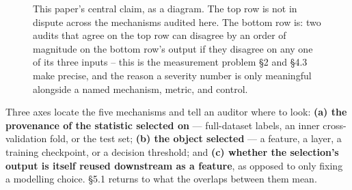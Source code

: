 \documentclass[10pt]{article} %
\begin{document}
\begin{figure}[!ht]
\centering
{}
\caption{This paper's central claim, as a diagram. The top row is not in
dispute across the mechanisms audited here. The bottom row is: two audits
that agree on the top row can disagree by an order of magnitude on the
bottom row's output if they disagree on any one of its three inputs --
this is the measurement problem §2 and §4.3 make precise, and the reason a
severity number is only meaningful alongside a named mechanism, metric,
and control.}
\label{fig:central-claim}
\end{figure}

Three axes locate the five mechanisms and tell an auditor where to look:
\textbf{(a) the provenance of the statistic selected on} --- full-dataset
labels, an inner cross-validation fold, or the test set; \textbf{(b) the object
selected} --- a feature, a layer, a training checkpoint, or a decision
threshold; and \textbf{(c) whether the selection's output is itself reused
downstream as a feature}, as opposed to only fixing a modelling choice. §5.1
returns to what the overlaps between them mean.
\end{document}
